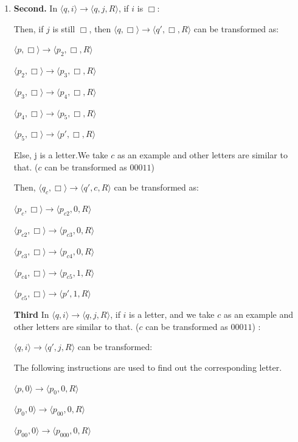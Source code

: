 \documentclass[12pt,a4paper]{article}
\makeatletter
\newtheorem*{solution}{Solution}
\theoremstyle{definition}
\renewenvironment{solution}[1][Solution] {\par\pushQED{\qed}\normalfont\topsep6\p@\@plus6\p@\relax\trivlist\item[\hskip\labelsep\bfseries#1\@addpunct{.}]\ignorespaces}{\popQED\endtrivlist\@endpefalse} \makeatother
\makeatother
\begin{document}
\begin{enumerate}
\begin{solution}
			\textbf{Second. }In  $\langle q,i\rangle\rightarrow \langle q,j,R\rangle$, if $i$ is $\Box$:
			
			Then, if $j$ is still $\Box$, then 
			$\langle q,\Box \rangle \rightarrow \langle q',\Box ,R\rangle $ can be transformed as:
			
			$\langle p,\Box \rangle \rightarrow \langle p_2,\Box,R \rangle $
			
			$\langle p_2,\Box \rangle \rightarrow \langle p_3,\Box,R \rangle $
			
			$\langle p_3,\Box \rangle \rightarrow \langle p_4,\Box,R \rangle $
			
			$\langle p_4,\Box \rangle \rightarrow \langle p_5,\Box,R \rangle $
			
			$\langle p_5,\Box \rangle \rightarrow \langle p',\Box,R \rangle $
			
			
			Else, j is a letter.We take $c$ as an example and other letters are similar to that. ($c$ can be transformed as $00011$) 
			
			Then, $\langle q_c,\Box \rangle \rightarrow \langle q',c ,R\rangle $ can be transformed as:
			
			$\langle p_c,\Box \rangle \rightarrow \langle p_{c2},0,R \rangle $
			
			$\langle p_{c2},\Box \rangle \rightarrow \langle p_{c3},0,R \rangle $
			
			$\langle p_{c3},\Box \rangle \rightarrow \langle p_{c4},0,R \rangle $
			
			$\langle p_{c4},\Box \rangle \rightarrow \langle p_{c5},1,R \rangle $
			
			$\langle p_{c5},\Box \rangle \rightarrow \langle p',1,R \rangle $
			
			\textbf{Third }In  $\langle q,i\rangle\rightarrow \langle q,j,R\rangle$, if $i$ is a letter, and we take $c$ as an example and other letters are similar to that. ($c$ can be transformed as $00011$)  :
			
			
			$\langle q,i \rangle \rightarrow \langle q',j ,R\rangle $ can be transformed:
			
			The following instructions are used to find out the corresponding letter.
			
			$\langle p,0 \rangle \rightarrow \langle p_0,0,R \rangle $
			
			$\langle p_0,0 \rangle \rightarrow \langle p_{00},0,R \rangle $
			
			$\langle p_{00},0 \rangle \rightarrow \langle p_{000},0,R \rangle $
			

\end{solution}
\end{enumerate}
\end{document}
